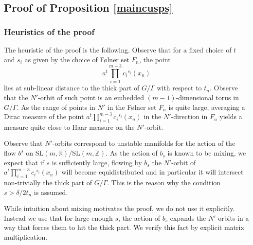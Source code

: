 \documentclass[10pt,reqno]{amsart}
\theoremstyle{Theorem}
\theoremstyle{definition}
\theoremstyle{remark}
\newcommand{\R}{\mathbb {R}}
\newcommand{\Z}{\mathbb {Z}}
\newcommand{\Xt}{X_{\mathrm{thick}}}
\newcommand{\Sl}{\mathrm{SL}}
\newcommand{\id}{\mathrm{Id}}
\def\Folner{F{\o}lner }
\begin{document}
\subsection{Proof of Proposition \ref{maincusps}}
\label{section:goodcusps}
\subsubsection{Heuristics of the proof} The heuristic of the proof is the following.  Observe that for a fixed choice of $t$ and $s_i$ as given by the choice of \Folner set $F_n$, the point $$a^t\prod_{i=1}^{m-3}{c_i}^{s_i}(x_n)$$ lies at sub-linear distance to the thick part of $G/\Gamma$ with respect to $t_n$. Observe that the $N'$-orbit of such point is an embedded $(m-1)$-dimensional torus in $G/\Gamma$. As the range of points in $N'$ in the  \Folner set $F_n$ is quite large,  averaging a Dirac measure of the point $a^t\prod_{i=1}^{m-3}{c_i}^{s_i}(x_n)$ in the $N'$-direction in $F_n$ yields a measure quite close to Haar measure on the $N'$-orbit.

Observe that $N'$-orbits correspond to unstable manifolds for the action of the flow $b^s$ on  $\Sl(m,\R)/\Sl(m,\Z)$. As the action of $b_s$ is known to be mixing, we expect that if  $s$ is sufficiently large, flowing by $b_s$ the $N'$-orbit of $a^t\prod_{i=1}^{m-3}{c_i}^{s_i}(x_n)$ will become equidistributed and in particular it will intersect non-trivially the thick part of $G/\Gamma$. This is the reason why the condition $s > \delta/2 t_n$ is assumed.

While intuition about mixing motivates the proof, we do not use it explicitly.  Instead we use that for large enough $s$, the action of $b_s$ expands the $N'$-orbits in a way that forces them to hit the thick part. We verify this fact by explicit matrix multiplication.


\end{document}
